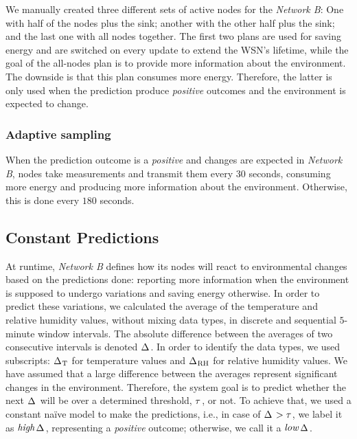 \documentclass{llncs}
\newcommand{\ourDelta}[2][]{\ensuremath{\Delta\textsuperscript{\text{#1}}
\textsubscript{\text{#2}}}}
\newcommand{\high}[1][ ]{\ensuremath{\text{\emph{high}}#1}}
\newcommand{\low}[1][ ]{\ensuremath{\text{\emph{low}}#1}}
\newcommand{\highDelta}[2][]{\high{\ourDelta[#1]{#2}}}
\newcommand{\lowDelta}[2][]{\low{\ourDelta[#1]{#2}}}
\newcommand{\threshold}[1][]{\ensuremath{\tau\textsubscript{#1}}}
\begin{document}
We manually created three different sets of active nodes for the \emph{Network 
B}: One with half of the nodes plus the sink; another with the other half plus 
the sink; and the last one with all nodes together. The first two plans are 
used for saving energy and are switched on every update to extend the WSN's 
lifetime, while the goal of the all-nodes plan is to provide more information 
about the environment. The downside is that this plan consumes more energy. 
Therefore, the latter is only used when the prediction produce 
\emph{positive} outcomes and the environment is expected to change. 

\subsubsection{Adaptive sampling}

When the prediction outcome is a \emph{positive} and changes are expected in 
\emph{Network B}, nodes take measurements and transmit them every $30$ seconds, 
consuming more energy and producing more information about the environment. 
Otherwise, this is done every $180$ seconds.

\subsection{Constant Predictions}
\label{sec:system-goal-definition}

At runtime, \emph{Network B} defines how its nodes will react to environmental 
changes based on the predictions done: reporting more information when the 
environment is supposed to undergo variations and saving energy otherwise.
In order to predict these variations, we calculated the average of the 
temperature and relative humidity values, without mixing data types, in 
discrete and sequential $5$-minute window intervals. The absolute difference 
between the averages of two consecutive intervals is denoted \ourDelta{}.
In order to identify the data types, we used subscripts: \ourDelta{T} 
for temperature values and \ourDelta{RH} for relative humidity values.
We have assumed that a large difference between the averages 
represent significant changes in the environment.
Therefore, the system goal is to predict whether the next \ourDelta{} will be 
over a determined threshold, \threshold{}, or not. 
To achieve that, we used a constant na\"ive model to make the predictions, 
i.e., in case of $\ourDelta{} > \threshold{}$, we label it as \highDelta{}, 
representing a \emph{positive} outcome; 
otherwise, we call it a \lowDelta{}. 
\end{document}
